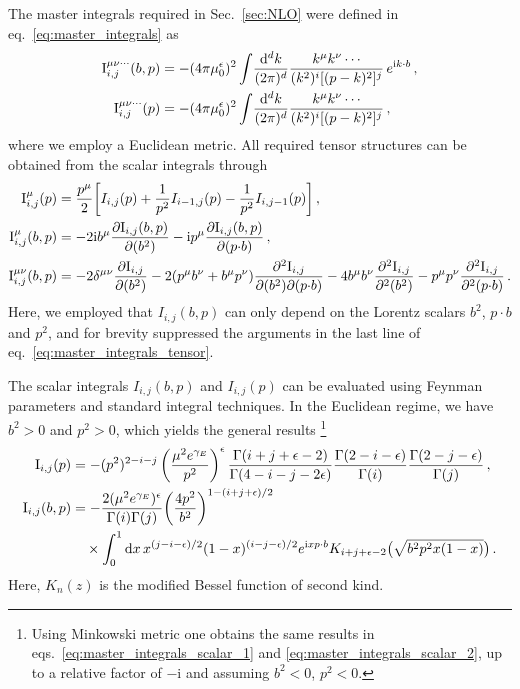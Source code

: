\documentclass[11pt,a4paper]{article}
\DeclareRobustCommand{\eq}[1]{eq.~\eqref{eq:#1}}
\DeclareRobustCommand{\eqs}[2]{eqs.~\eqref{eq:#1} and \eqref{eq:#2}}
\DeclareRobustCommand{\sec}[1]{Sec.~\ref{sec:#1}}
\newcommand{\df}{\mathrm{d}}
\newcommand{\img}{\mathrm{i}}
\newcommand{\eps}{\epsilon}
\newcommand{\nn}{\nonumber}
\newcommand{\pb}{{p{\cdot}b}}
\newcommand{\MI}{\mathbf{\rm I}}
\begin{document}
The master integrals required in \sec{NLO} were defined in \eq{master_integrals} as
\begin{align}
 \MI_{i,j}^{\mu \nu \cdots}(b,p) &
 = - (4\pi\mu_0^{\eps})^2 \int\!\frac{\df^d k}{(2\pi)^d} \frac{k^\mu k^\nu \cdots}{(k^2)^i [(p-k)^2]^j} \, e^{\img k \cdot b}
\,,\nn\\
 \MI_{i,j}^{\mu \nu \cdots}(p) &
 = - (4\pi\mu_0^{\eps})^2 \int\!\frac{\df^d k}{(2\pi)^d} \frac{k^\mu k^\nu \cdots}{(k^2)^i [(p-k)^2]^j}
\,,\end{align}
where we employ a Euclidean metric.
All required tensor structures can be obtained from the scalar integrals through
\begin{align} \label{eq:master_integrals_tensor}
 \MI_{i,j}^\mu(p) &
 = \frac{p^\mu}{2} \biggl[ I_{i,j}(p) + \frac{1}{p^2} I_{i-1,j}(p) - \frac{1}{p^2} I_{i,j-1}(p) \biggr]
\,,\\
 \MI_{i,j}^\mu(b,p) &
 = -2 \img b^\mu \frac{\partial \MI_{i,j}(b,p)}{\partial (b^2)} -\img p^\mu \frac{\partial \MI_{i,j}(b,p)}{\partial (\pb)}
\,,\nn\\
 \MI_{i,j}^{\mu\nu}(b,p) &
 = -2 \delta^{\mu\nu} \frac{\partial \MI_{i,j}}{\partial (b^2)}
 - 2 (p^\mu b^\nu + b^\mu p^\nu) \frac{\partial^2 \MI_{i,j}}{\partial (b^2) \partial (\pb)}
 - 4 b^\mu b^\nu \frac{\partial^2 \MI_{i,j}}{\partial^2 (b^2)}
 - p^\mu p^\nu \frac{\partial^2 \MI_{i,j}}{\partial^2(\pb)}
\nn
\,.\end{align}
Here, we employed that $I_{i,j}(b,p)$ can only depend on the Lorentz scalars $b^2$, $\pb$ and $p^2$,
and for brevity suppressed the arguments in the last line of \eq{master_integrals_tensor}.

The scalar integrals $I_{i,j}(b,p)$ and $I_{i,j}(p)$ can be evaluated using Feynman parameters
and standard integral techniques. In the Euclidean regime, we have $b^2 > 0$ and $p^2 > 0$,
which yields the general results%
\footnote{Using Minkowski metric one obtains the same results in \eqs{master_integrals_scalar_1}{master_integrals_scalar_2},
up to a relative factor of $-\img$ and assuming $b^2 < 0$, $p^2 < 0$.}
\begin{align} \label{eq:master_integrals_scalar_1}
 \MI_{i,j}(p) &
 = -(p^2)^{2-i-j} \left(\frac{\mu^2 e^{\gamma_E}}{p^2}\right)^{\eps}
   \frac{\Gamma(i+j+\eps-2)}{\Gamma(4-i-j-2\eps)}
   \frac{\Gamma(2-i-\eps)}{\Gamma(i)} \frac{\Gamma(2-j-\eps)}{\Gamma(j)}
\,, \\ \label{eq:master_integrals_scalar_2}
 \MI_{i,j}(b,p) &
 = -\frac{2 (\mu^2 e^{\gamma_E})^\eps}{\Gamma(i)\Gamma(j)}
   \biggl(\frac{4 p^2}{b^2}\biggr)^{1 - (i+j+\eps)/2}
   \nn\\&\quad\times
   \int_0^1 \df x\, x^{(j-i-\eps)/2} (1-x)^{(i-j-\eps)/2} e^{\img x \pb}
   K_{i+j+\eps-2}\bigl(\sqrt{b^2 p^2 x (1-x)}\bigr)
\,.\end{align}
Here, $K_n(z)$ is the modified Bessel function of second kind.
\end{document}
